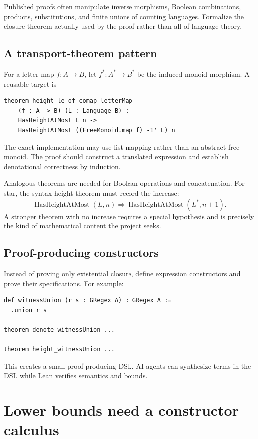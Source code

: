 \documentclass{amsart}
\begin{document}
Published proofs often manipulate inverse morphisms, Boolean combinations, products, substitutions, and finite unions of counting languages.  Formalize the closure theorem actually used by the proof rather than all of language theory.

\subsection{A transport-theorem pattern}

For a letter map $f:A\to B$, let $f^\ast:A^\ast\to B^\ast$ be the induced monoid morphism.  A reusable target is
\begin{lstlisting}[language={}]
theorem height_le_of_comap_letterMap
    (f : A -> B) (L : Language B) :
    HasHeightAtMost L n ->
    HasHeightAtMost ((FreeMonoid.map f) -1' L) n
\end{lstlisting}
The exact implementation may use list mapping rather than an abstract free monoid.  The proof should construct a translated expression and establish denotational correctness by induction.

Analogous theorems are needed for Boolean operations and concatenation.  For star, the syntax-height theorem must record the increase:
\[
\operatorname{HasHeightAtMost}(L,n)
\Longrightarrow
\operatorname{HasHeightAtMost}(L^\ast,n+1).
\]
A stronger theorem with no increase requires a special hypothesis and is precisely the kind of mathematical content the project seeks.

\subsection{Proof-producing constructors}

Instead of proving only existential closure, define expression constructors and prove their specifications.  For example:
\begin{lstlisting}[language={}]
def witnessUnion (r s : GRegex A) : GRegex A :=
  .union r s

theorem denote_witnessUnion ...

theorem height_witnessUnion ...
\end{lstlisting}
This creates a small proof-producing DSL.  AI agents can synthesize terms in the DSL while Lean verifies semantics and bounds.

\section{Lower bounds need a constructor calculus}
\end{document}
